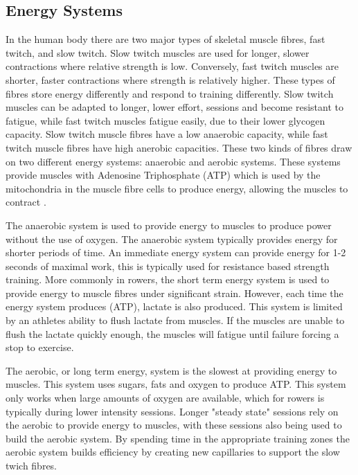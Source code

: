 \subsection{Energy Systems}
\label{sub:energy_systems}
In the human body there are two major types of skeletal muscle fibres, fast twitch, and slow twitch. Slow twitch muscles are used for longer, slower contractions where relative strength is low. Conversely, fast twitch muscles are shorter, faster contractions where strength is relatively higher. These types of fibres store energy differently and respond to training differently. Slow twitch muscles can be adapted to longer, lower effort, sessions and become resistant to fatigue, while fast twitch muscles fatigue easily, due to their lower glycogen capacity. Slow twitch muscle fibres have a low anaerobic capacity, while fast twitch muscle fibres have high anerobic capacities. These two kinds of fibres draw on two different energy systems: anaerobic and aerobic systems. These systems provide muscles with Adenosine Triphosphate (ATP) which is used by the mitochondria in the muscle fibre cells to produce energy, allowing the muscles to contract \cite{Göktepe2007}. 

The anaerobic system is used to provide energy to muscles to produce power without the use of oxygen. The anaerobic system typically provides energy for shorter periods of time. An immediate energy system can provide energy for 1-2 seconds of maximal work, this is typically used for resistance based strength training. More commonly in rowers, the short term energy system is used to provide energy to muscle fibres under significant strain. However, each time the energy system produces (ATP), lactate is also produced. This system is limited by an athletes ability to flush lactate from muscles. If the muscles are unable to flush the lactate quickly enough, the muscles will fatigue until failure forcing a stop to exercise. 

The aerobic, or long term energy, system is the slowest at providing energy to muscles. This system uses sugars, fats and oxygen to produce ATP. This system only works when large amounts of oxygen are available, which for rowers is typically during lower intensity sessions. Longer "steady state" sessions rely on the aerobic to provide energy to muscles, with these sessions also being used to build the aerobic system. By spending time in the appropriate training zones the aerobic system builds efficiency by creating new capillaries to support the slow twich fibres.

